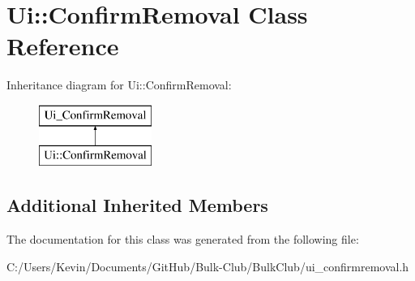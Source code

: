 \hypertarget{class_ui_1_1_confirm_removal}{}\section{Ui\+:\+:Confirm\+Removal Class Reference}
\label{class_ui_1_1_confirm_removal}
Inheritance diagram for Ui\+:\+:Confirm\+Removal\+:\begin{figure}[H]
\begin{center}
\leavevmode
\includegraphics[height=2.000000cm]{class_ui_1_1_confirm_removal}
\end{center}
\end{figure}
\subsection*{Additional Inherited Members}


The documentation for this class was generated from the following file\+:\begin{DoxyCompactItemize}
\item 
C\+:/\+Users/\+Kevin/\+Documents/\+Git\+Hub/\+Bulk-\/\+Club/\+Bulk\+Club/ui\+\_\+confirmremoval.\+h\end{DoxyCompactItemize}
